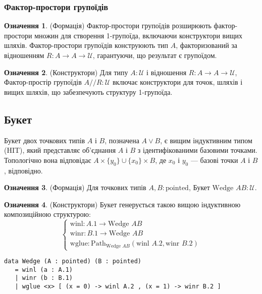 \documentclass{article}
\theoremstyle{definition}
\newtheorem{definition}{Означення}
\begin{document}
\subsubsection*{Фактор-простори групоїдів}
\begin{definition} (Формація)
Фактор-простори групоїдів розширюють фактор-простори множин для створення 1-групоїда,
включаючи конструктори вищих шляхів. Фактор-простори групоїдів
конструюють тип \( A \), факторизований за відношенням \( R : A \to A \to \mathcal{U} \),
гарантуючи, що результат є групоїдом.
\end{definition}

\begin{definition} (Конструктори)
Для типу \( A : \mathcal{U} \) і відношення \( R : A \to A \to \mathcal{U} \),
Фактор-простір групоїдів \(  A // R : \mathcal{U} \) включає
конструктори для точок, шляхів і вищих шляхів, що забезпечують структуру 1-групоїда.
\end{definition}

\newpage
\subsection{Букет}
Букет двох точкових типів \( A \) і \( B \), позначена \( A \vee B \),
є вищим індуктивним типом (HIT), який представляє об’єднання \( A \)
і \( B \) з ідентифікованими базовими точками. Топологічно
вона відповідає \( A \times \{ y_0 \} \cup \{ x_0 \} \times B \),
де \( x_0 \) і \( y_0 \) — базові точки \( A \) і \( B \), відповідно.

\begin{definition} (Формація)
Для точкових типів \( A, B : \text{pointed} \), Букет \( \text{Wedge } A B : \mathcal{U} \).
\end{definition}

\begin{definition} (Конструктори)
Букет генерується такою вищою індуктивною композиційною структурою:
\[
\begin{cases}
\text{winl} : A.1 \to \text{Wedge } A B \\
\text{winr} : B.1 \to \text{Wedge } A B \\
\text{wglue} : \text{Path}_{\text{Wedge } A B} (\text{winl } A.2, \text{winr } B.2)
\end{cases}
\]
\begin{lstlisting}
data Wedge (A : pointed) (B : pointed)
   = winl (a : A.1)
   | winr (b : B.1)
   | wglue <x> [ (x = 0) -> winl A.2 , (x = 1) -> winr B.2 ]
\end{lstlisting}
\end{definition}
\end{document}
